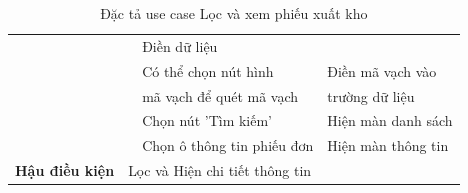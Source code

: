 \documentclass[../DoAn.tex]{subfiles}
\begin{document}
\begin{table}[H]
\begin{tabular}{|l|c|l|l|}
                                                &                                                                                 & Điền dữ liệu                            &                                                 \\
                                                &                                                                                 & Có thể chọn nút hình                    & Điền mã vạch vào                                \\
                                                &                                                                                 & mã vạch để quét mã vạch                 & trường dữ liệu                                  \\ \cline{3-4}
                                                &                                                                                 & Chọn nút 'Tìm kiếm'                     & Hiện màn danh sách                              \\ \cline{3-4}
                                                &                                                                                 & Chọn ô thông tin phiếu đơn              & Hiện màn thông tin                              \\ \hline
        \textbf{Hậu điều kiện}                  & \multicolumn{3}{l|}{Lọc và Hiện chi tiết thông tin}                                                                                                                         \\ \hline
    \end{tabular}
    \caption{Đặc tả use case Lọc và xem phiếu xuất kho}
    \label{table:uc-exportreport-filter}
\end{table}
\break
\end{document}
